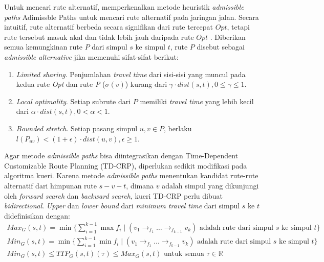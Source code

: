 Untuk mencari rute alternatif, \cite{Abraham2010} memperkenalkan metode heuristik \textit{admissible paths} Adimissble Paths untuk mencari rute alternatif pada jaringan jalan. Secara intuitif, rute alternatif berbeda secara signifikan dari rute tercepat $Opt$, tetapi rute tersebut masuk akal dan tidak lebih jauh daripada rute $Opt$ \cite{Abraham2010}. Diberikan semua kemungkinan rute $P$ dari simpul $s$ ke simpul $t$, rute $P$ disebut sebagai \textit{admissible alternative} jika memenuhi sifat-sifat berikut:
\begin{enumerate}
    \item \textit{Limited sharing}. Penjumlahan \textit{travel time} dari sisi-sisi yang muncul pada kedua rute \textit{Opt} dan rute \textit{P} ($\sigma(v)$) kurang dari $\gamma \cdot dist(s,t), 0 \leq \gamma \leq 1$.
    \item \textit{Local optimality}. Setiap subrute dari $P$ memiliki \textit{travel time} yang lebih kecil dari $\alpha \cdot dist(s,t), 0<\alpha<1$.
    \item \textit{Bounded stretch}. Setiap pasang simpul $u,v\in P$, berlaku $l(P_{uv})< (1+\epsilon)\cdot dist(u,v), \epsilon \geq 1$. 
\end{enumerate}

Agar metode \textit{admissible paths} bisa diintegrasikan dengan Time-Dependent Customizable Route Planning (TD-CRP), diperlukan sedikit modifikasi pada algoritma kueri. Karena metode \textit{admissible paths} menentukan kandidat rute-rute alternatif dari himpunan rute $s-v-t$, dimana $v$ adalah simpul yang dikunjungi oleh \textit{forward search} dan \textit{backward search}, kueri TD-CRP perlu dibuat \textit{bidirectional}. \textit{Upper} dan \textit{lower bound} dari \textit{minimum travel time } dari simpul $s$ ke $t$ didefinisikan dengan:
\begin{align}
    Max_{G}(s,t)=\min \{ \sum_{i=1}^{k-1} \max f_i \mid (v_1 \rightarrow_{f_1} \ldots \rightarrow_{f_{k-1}} v_k ) \text{ adalah rute dari simpul } s \text{ ke simpul } t \} \\ 
    Min_{G}(s,t)=\min \{ \sum_{i=1}^{k-1} \min f_i \mid (v_1 \rightarrow_{f_1} \ldots \rightarrow_{f_{k-1}} v_k ) \text{ adalah rute dari simpul } s \text{ ke simpul } t \} \\
    Min_{G}(s,t)\leq TTP_G(s,t)(\tau)\leq Max_G(s,t) \text{ untuk semua } \tau\in \mathbb{R}
\end{align}



